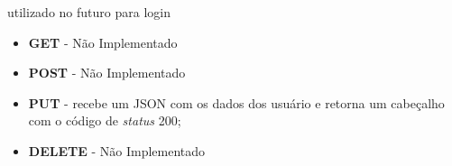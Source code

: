 \begin{enumerate}
\begin{itemize}
\begin{itemize}
					utilizado no futuro para login
						\begin{itemize}
									  \item \textbf{GET} - Não Implementado
									  \item \textbf{POST} - Não Implementado
									  \item \textbf{PUT} - recebe um JSON com os dados dos usuário e
									  retorna um cabeçalho com o código de  \textit{status} 200;
									  \item \textbf{DELETE} - Não Implementado
									\end{itemize}
				\end{itemize}
		\end{itemize}
\end{enumerate}
